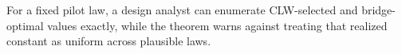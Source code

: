 For a fixed pilot law, a design analyst can enumerate CLW-selected and bridge-optimal values exactly, while the theorem warns against treating that realized constant as uniform across plausible laws.